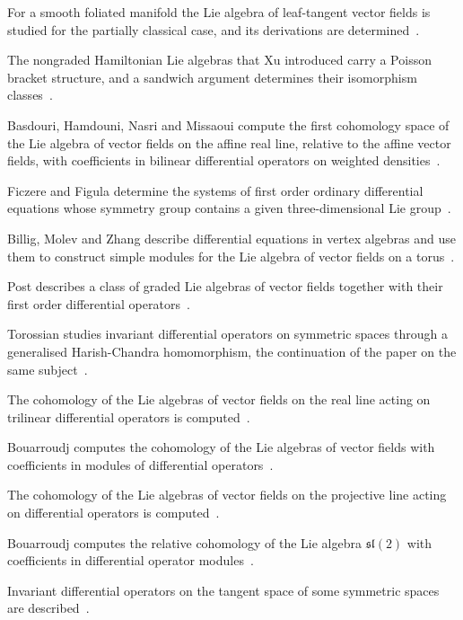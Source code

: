 For a smooth foliated manifold the Lie algebra of leaf-tangent vector fields is studied for the partially classical case, and its derivations are determined~\cite{WlSomeLieAlgebras1981}.

The nongraded Hamiltonian Lie algebras that Xu introduced carry a Poisson bracket structure, and a sandwich argument determines their isomorphism classes~\cite{WlPoissonBracketsAnd2003}.

Basdouri, Hamdouni, Nasri and Missaoui compute the first cohomology space of the Lie algebra of vector fields on the affine real line, relative to the affine vector fields, with coefficients in bilinear differential operators on weighted densities~\cite{WlFirstCohomologyOfTheLieAlgebra2020}.

Ficzere and Figula determine the systems of first order ordinary differential equations whose symmetry group contains a given three-dimensional Lie group~\cite{WlSystemsOfFirstOrderOrdinaryDif2020}.

Billig, Molev and Zhang describe differential equations in vertex algebras and use them to construct simple modules for the Lie algebra of vector fields on a torus~\cite{WlBilligYMolevAZhangRDifferentia2020}.

Post describes a class of graded Lie algebras of vector fields together with their first order differential operators~\cite{WlAClassOfGradedLieAlgebrasOfVec2020}.

Torossian studies invariant differential operators on symmetric spaces through a generalised Harish-Chandra homomorphism, the continuation of the paper on the same subject~\cite{WlInvariantDifferentialOperators2020}.

The cohomology of the Lie algebras of vector fields on the real line acting on trilinear differential operators is computed~\cite{WlCohomologyOfTheVectorFieldsLie2020}.

Bouarroudj computes the cohomology of the Lie algebras of vector fields with coefficients in modules of differential operators~\cite{WlBouarroudjSofianeCohomologyOfT2020}.

The cohomology of the Lie algebras of vector fields on the projective line acting on differential operators is computed~\cite{WlCohomologyOfTheVectorFieldsLie2020}.

Bouarroudj computes the relative cohomology of the Lie algebra $\mathfrak{sl}(2)$ with coefficients in differential operator modules~\cite{WlBouarroudjSOnMathfrakSl2Relati2020}.

Invariant differential operators on the tangent space of some symmetric spaces are described~\cite{WlInvariantDifferentialOperators2020}.

